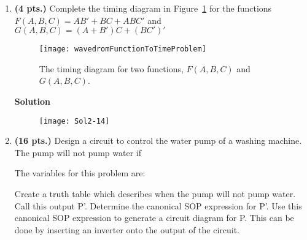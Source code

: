 \begin{enumerate}
                    \item \textbf{ (4 pts.)} Complete the timing diagram in Figure~\ref{fig:HWtime}
                        for the functions
                        $F(A,B,C) = AB' + BC + ABC'$ and $G(A,B,C) = (A+B')C + (BC')'$
                        \begin{figure}[ht]
                            \texttt{[image: wavedromFunctionToTimeProblem]}
                            \caption{The timing diagram for two functions, $F(A,B,C)$ and $G(A,B,C)$.}
                            \label{fig:HWtime}
                        \end{figure}
                        \filbreak
                        \begin{onlysolution}  \textbf{Solution}
                            \begin{figure}[h!]
                                \texttt{[image: Sol2-14]}
                            \end{figure}
                        \end{onlysolution}
                        \filbreak
                    \item\textbf{ (16 pts.)} Design a circuit to control
                        the water pump of a washing machine.  The pump will not pump
                        water if

                        The variables for this problem are:

                        Create a truth table which describes when the pump will not
                        pump water.  Call this output P'.  Determine the canonical SOP
                        expression for P'.  Use this canonical SOP expression to generate
                        a circuit diagram for P.  This can be done by inserting an
                        inverter onto the output of the circuit.


\end{enumerate}
